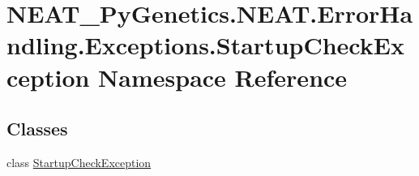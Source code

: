 \hypertarget{namespaceNEAT__PyGenetics_1_1NEAT_1_1ErrorHandling_1_1Exceptions_1_1StartupCheckException}{}\section{N\+E\+A\+T\+\_\+\+Py\+Genetics.\+N\+E\+A\+T.\+Error\+Handling.\+Exceptions.\+Startup\+Check\+Exception Namespace Reference}
\label{namespaceNEAT__PyGenetics_1_1NEAT_1_1ErrorHandling_1_1Exceptions_1_1StartupCheckException}
\subsection*{Classes}
\begin{DoxyCompactItemize}
\item 
class \hyperlink{classNEAT__PyGenetics_1_1NEAT_1_1ErrorHandling_1_1Exceptions_1_1StartupCheckException_1_1StartupCheckException}{Startup\+Check\+Exception}
\end{DoxyCompactItemize}
